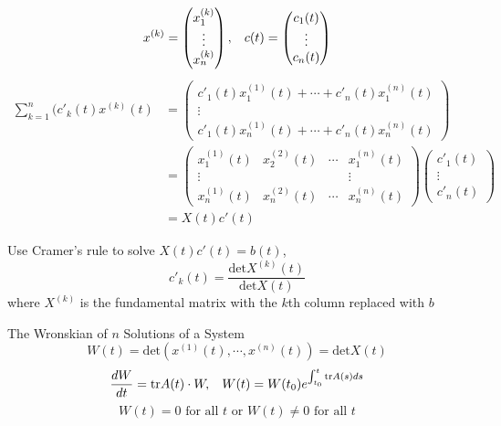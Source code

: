 \documentclass{beamer}
\begin{document}
\begin{frame}
$$x^{(k)}=\begin{pmatrix}
x_1^{(k)}\\
\vdots\\
x_n^{(k)}
\end{pmatrix},\hspace{3mm}c(t)=\begin{pmatrix}
c_1(t)\\
\vdots\\
c_n(t)
\end{pmatrix} $$
\begin{align*}
\sum\limits_{k=1}^n(c'_k(t)x^{(k)}(t)&=\begin{pmatrix}
c'_1(t)x_1^{(1)}(t)+\cdots+c'_n(t)x_1^{(n)}(t)\\
\vdots\\
c'_1(t)x_n^{(1)}(t)+\cdots+c'_n(t)x_n^{(n)}(t)
\end{pmatrix}\\
&=\begin{pmatrix}
x_1^{(1)}(t)&x_2^{(2)}(t)&\cdots&x_1^{(n)}(t)\\
\vdots&&&\vdots\\
x_n^{(1)}(t)&x_n^{(2)}(t)&\cdots&x_n^{(n)}(t)
\end{pmatrix}
\begin{pmatrix}
c'_1(t)\\
\vdots\\
c'_n(t)
\end{pmatrix}\\
&=X(t)c'(t)
\end{align*}
\end{frame}

\begin{frame}
\begin{block}{}
Use Cramer's rule to solve $X(t)c'(t)=b(t)$,
$$c'_k(t)=\dfrac{\text{det}X^{(k)}(t)}{\text{det}X(t)} $$
where $X^{(k)}$ is the fundamental matrix with the $k$th column replaced with $b$
\end{block}

\begin{block}{The Wronskian of $n$ Solutions of a System}
$$W(t)=\text{det}(x^{(1)}(t),\cdots,x^{(n)}(t))=\text{det}X(t)$$
$$\dfrac{dW}{dt}=\text{tr}A(t)\cdot W,\hspace{3mm} W(t)=W(t_0)e^{\int_{t_0}^t\text{tr}A(s)ds}$$
$$W(t)=0\text{ for all }t\text{ or }W(t)\neq0\text{ for all }t$$
\end{block}
\end{frame}
\end{document}
